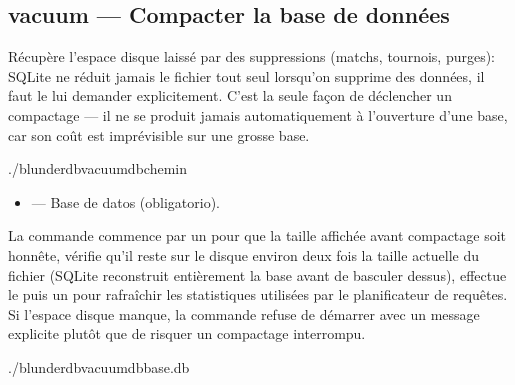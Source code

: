 \documentclass[letterpaper,10pt,spanish]{sphinxmanual}
\begin{document}
\subsection{vacuum — Compacter la base de données}
\label{\detokenize{cli:vacuum-compacter-la-base-de-donnees}}
\sphinxAtStartPar
Récupère l’espace disque laissé par des suppressions (matchs, tournois,
purges): SQLite ne réduit jamais le fichier tout seul lorsqu’on supprime des
données, il faut le lui demander explicitement. C’est la seule façon de
déclencher un compactage — il ne se produit jamais automatiquement à
l’ouverture d’une base, car son coût est imprévisible sur une grosse base.

\begin{sphinxVerbatim}[commandchars=\\\{\}]
./blunderdbvacuum\PYGZhy{}\PYGZhy{}db\PYGZlt{}chemin\PYGZgt{}
\end{sphinxVerbatim}

\sphinxAtStartPar
{}
\begin{itemize}
\item {} 
\sphinxAtStartPar
{} — Base de datos (obligatorio).

\end{itemize}

\sphinxAtStartPar
La commande commence par un  pour que la taille
affichée avant compactage soit honnête, vérifie qu’il reste sur le disque
environ deux fois la taille actuelle du fichier (SQLite reconstruit
entièrement la base avant de basculer dessus), effectue le  puis un
 pour rafraîchir les statistiques utilisées par le planificateur de
requêtes. Si l’espace disque manque, la commande refuse de démarrer avec un
message explicite plutôt que de risquer un compactage interrompu.

\sphinxAtStartPar
{}

\begin{sphinxVerbatim}[commandchars=\\\{\}]
./blunderdbvacuum\PYGZhy{}\PYGZhy{}dbbase.db

\end{sphinxVerbatim}
\end{document}
